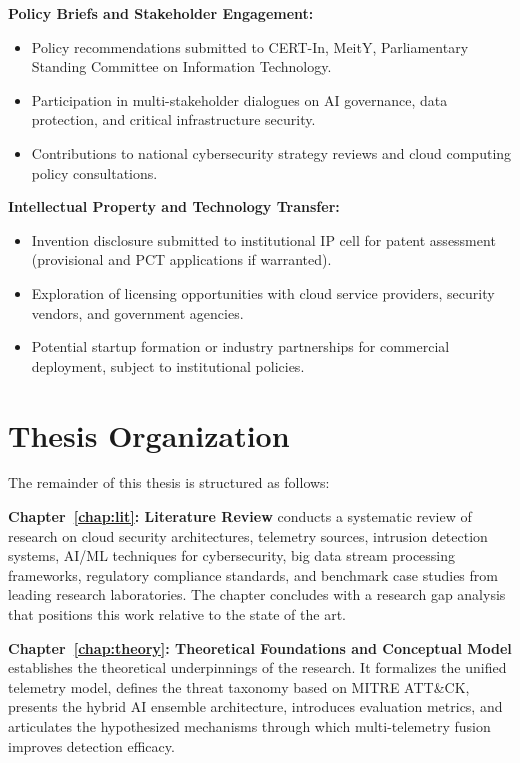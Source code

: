 \textbf{Policy Briefs and Stakeholder Engagement:}
\begin{itemize}
    \item Policy recommendations submitted to CERT-In, MeitY, Parliamentary Standing Committee on Information Technology.
    \item Participation in multi-stakeholder dialogues on AI governance, data protection, and critical infrastructure security.
    \item Contributions to national cybersecurity strategy reviews and cloud computing policy consultations.
\end{itemize}

\textbf{Intellectual Property and Technology Transfer:}
\begin{itemize}
    \item Invention disclosure submitted to institutional IP cell for patent assessment (provisional and PCT applications if warranted).
    \item Exploration of licensing opportunities with cloud service providers, security vendors, and government agencies.
    \item Potential startup formation or industry partnerships for commercial deployment, subject to institutional policies.
\end{itemize}

\section{Thesis Organization}\label{sec:intro-organization}
The remainder of this thesis is structured as follows:

\textbf{Chapter~\ref{chap:lit}: Literature Review} conducts a systematic review of research on cloud security architectures, telemetry sources, intrusion detection systems, AI/ML techniques for cybersecurity, big data stream processing frameworks, regulatory compliance standards, and benchmark case studies from leading research laboratories. The chapter concludes with a research gap analysis that positions this work relative to the state of the art.

\textbf{Chapter~\ref{chap:theory}: Theoretical Foundations and Conceptual Model} establishes the theoretical underpinnings of the research. It formalizes the unified telemetry model, defines the threat taxonomy based on MITRE ATT\&CK, presents the hybrid AI ensemble architecture, introduces evaluation metrics, and articulates the hypothesized mechanisms through which multi-telemetry fusion improves detection efficacy.

